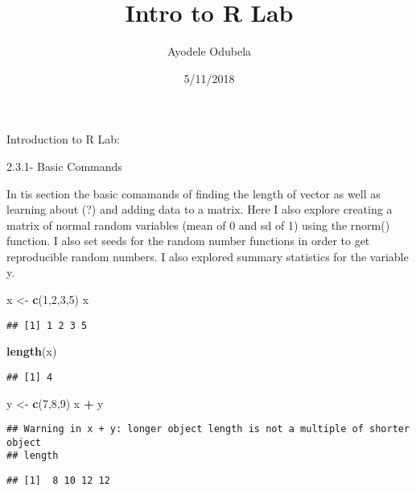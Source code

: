 \documentclass[]{article}
\title{Intro to R Lab}
\author{Ayodele Odubela}
\date{5/11/2018}
\newenvironment{Shaded}{\begin{snugshade}}{\end{snugshade}}
\newcommand{\KeywordTok}[1]{\textcolor[rgb]{0.13,0.29,0.53}{\textbf{#1}}}
\newcommand{\DecValTok}[1]{\textcolor[rgb]{0.00,0.00,0.81}{#1}}
\newcommand{\StringTok}[1]{\textcolor[rgb]{0.31,0.60,0.02}{#1}}
\newcommand{\OperatorTok}[1]{\textcolor[rgb]{0.81,0.36,0.00}{\textbf{#1}}}
\newcommand{\NormalTok}[1]{#1}
\begin{document}
\maketitle

Introduction to R Lab:

2.3.1- Basic Commands

In tis section the basic comamands of finding the length of vector as
well as learning about (?) and adding data to a matrix. Here I also
explore creating a matrix of normal random variables (mean of 0 and sd
of 1) using the rnorm() function. I also set seeds for the random number
functions in order to get reproducible random numbers. I also explored
summary statistics for the variable y.

\begin{Shaded}
\begin{Highlighting}[]
\NormalTok{x <-}\StringTok{ }\KeywordTok{c}\NormalTok{(}\DecValTok{1}\NormalTok{,}\DecValTok{2}\NormalTok{,}\DecValTok{3}\NormalTok{,}\DecValTok{5}\NormalTok{)}
\NormalTok{x}
\end{Highlighting}
\end{Shaded}

\begin{verbatim}
## [1] 1 2 3 5
\end{verbatim}

\begin{Shaded}
\begin{Highlighting}[]
\KeywordTok{length}\NormalTok{(x)}
\end{Highlighting}
\end{Shaded}

\begin{verbatim}
## [1] 4
\end{verbatim}

\begin{Shaded}
\begin{Highlighting}[]
\NormalTok{y <-}\StringTok{ }\KeywordTok{c}\NormalTok{(}\DecValTok{7}\NormalTok{,}\DecValTok{8}\NormalTok{,}\DecValTok{9}\NormalTok{)}
\NormalTok{x }\OperatorTok{+}\StringTok{ }\NormalTok{y}
\end{Highlighting}
\end{Shaded}

\begin{verbatim}
## Warning in x + y: longer object length is not a multiple of shorter object
## length
\end{verbatim}

\begin{verbatim}
## [1]  8 10 12 12
\end{verbatim}
\end{document}
